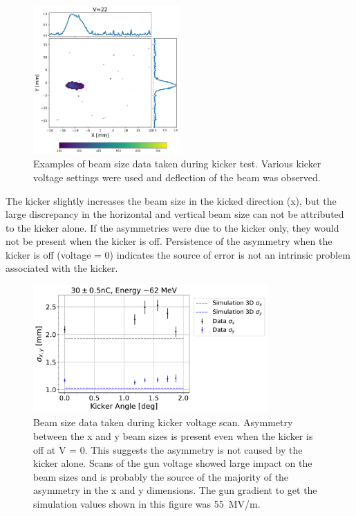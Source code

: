 \begin{figure}
	\includegraphics[width=0.5\textwidth]{./images/yag6_kicker_voltage22}%
	\caption{Examples of beam size data taken during kicker test. 
		Various kicker voltage settings were used and deflection of the beam was observed.}
	\label{fig:kickerbeamsize}
\end{figure}
The kicker slightly increases the beam size in the kicked direction (x), 
but the large discrepancy in the horizontal and vertical beam size can not be attributed to the kicker alone.
If the asymmetries were due to the kicker only, they would not be present when the kicker is off.
Persistence of the asymmetry when the kicker is off (voltage = 0) indicates 
the source of error is not an intrinsic problem associated with the kicker.
\begin{figure}
	\centering
	\includegraphics[width=0.8\textwidth]{./images/xybeamsizes_high_charge_kicker_scan_angle_asymmetric}
	\caption{Beam size data taken during kicker voltage scan. Asymmetry between the x and y beam sizes
		 is present even when the kicker is off at V = 0. This suggests the asymmetry is not
	     caused by the kicker alone. Scans of the gun voltage showed large impact on the beam sizes
     	 and is probably the source of the majority of the asymmetry in the x and y dimensions.
	 The gun gradient to get the simulation values shown in this figure was \SI{55}{MV/m}.} 
     \label{fig:beamsize}
\end{figure}

